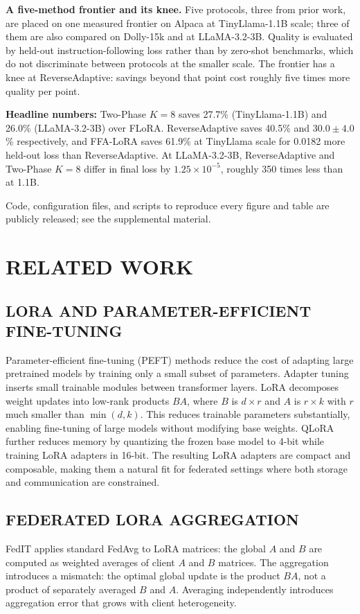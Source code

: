 \textbf{A five-method frontier and its knee.}
Five protocols, three from prior work, are placed on one measured frontier on Alpaca at TinyLlama-1.1B scale; three of them are also compared on Dolly-15k and at LLaMA-3.2-3B. Quality is evaluated by held-out instruction-following loss rather than by zero-shot benchmarks, which do not discriminate between protocols at the smaller scale. The frontier has a knee at ReverseAdaptive: savings beyond that point cost roughly five times more quality per point.

\textbf{Headline numbers:}
Two-Phase $K{=}8$ saves 27.7\% (TinyLlama-1.1B) and 26.0\% (LLaMA-3.2-3B) over FLoRA. ReverseAdaptive saves 40.5\% and $30.0 \pm 4.0$\% respectively, and FFA-LoRA saves 61.9\% at TinyLlama scale for 0.0182 more held-out loss than ReverseAdaptive. At LLaMA-3.2-3B, ReverseAdaptive and Two-Phase $K{=}8$ differ in final loss by $1.25 \times 10^{-5}$, roughly 350 times less than at 1.1B.

Code, configuration files, and scripts to reproduce every figure and table are publicly released; see the supplemental material.

\section{RELATED WORK}
\label{sec:related}

\subsection{LORA AND PARAMETER-EFFICIENT FINE-TUNING}
Parameter-efficient fine-tuning (PEFT) methods reduce the cost of adapting large pretrained models by training only a small subset of parameters. Adapter tuning \cite{houlsby2019parameter} inserts small trainable modules between transformer layers. LoRA \cite{hu2022lora} decomposes weight updates into low-rank products $BA$, where $B$ is $d \times r$ and $A$ is $r \times k$ with $r$ much smaller than $\min(d,k)$. This reduces trainable parameters substantially, enabling fine-tuning of large models without modifying base weights. QLoRA \cite{dettmers2023qlora} further reduces memory by quantizing the frozen base model to 4-bit while training LoRA adapters in 16-bit. The resulting LoRA adapters are compact and composable, making them a natural fit for federated settings where both storage and communication are constrained.

\subsection{FEDERATED LORA AGGREGATION}
FedIT \cite{zhang2024federatedgpt} applies standard FedAvg \cite{mcmahan2017communication} to LoRA matrices: the global $A$ and $B$ are computed as weighted averages of client $A$ and $B$ matrices. The aggregation introduces a mismatch: the optimal global update is the product $BA$, not a product of separately averaged $B$ and $A$. Averaging independently introduces aggregation error that grows with client heterogeneity.

